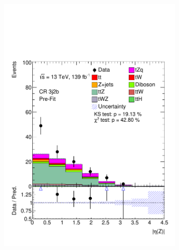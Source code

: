 \begin{figure}
\begin{subfigure}[b]{0.32\linewidth}
    \includegraphics[width=\linewidth]{ubonn-thesis/Chapters/Chapters_06/Figure/Input_distribution/CR_3j2b_Z_eta.pdf} 
  \end{subfigure}%
  \hspace*{0.3cm}
  \centering
  \begin{subfigure}[b]{0.32\linewidth}

\end{subfigure}
\end{figure}
